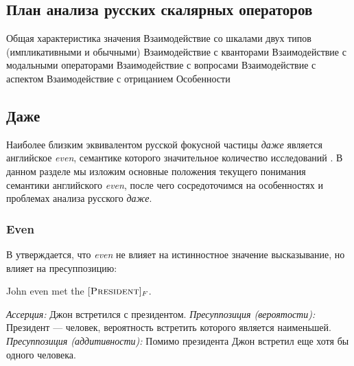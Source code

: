 \documentclass[a4paper, titlepage, 12pt]{article}
\begin{document}
\subsection{План анализа русских скалярных операторов} \label{additivityClassification}

\begin{exe}
    \ex \begin{xlist}
        \ex Общая характеристика значения
        \ex Взаимодействие со шкалами двух типов (импликативными и обычными)
        \ex Взаимодействие с кванторами
        \ex Взаимодействие с модальными операторами
        \ex Взаимодействие с вопросами
        \ex Взаимодействие с аспектом
        \ex Взаимодействие с отрицанием
        \ex Особенности
    \end{xlist}
\end{exe}

\subsection{Даже}

Наиболее близким эквивалентом русской фокусной частицы \textit{даже} является английское \textit{even}, семантике которого значительное количество исследований \citep{horn1969presuppositional,stalnaker1974pragmatic,rullmann1997even,iatridou2016our,kay1990even}. В данном разделе мы изложим основные положения текущего понимания семантики английского \textit{even}, после чего сосредоточимся на особенностях и проблемах анализа русского \textit{даже}.

\subsubsection{Even}

В \citep{horn1969presuppositional} утверждается, что \textit{even} не влияет на истинностное значение высказывание, но влияет на пресуппозицию:

\begin{exe}
    \ex \label{onlyAssPres} John even met the $ [\textsc{President}]_F $. \begin{xlist}
        \ex \textit{Ассерция:} Джон встретился с президентом.
        \ex \textit{Пресуппозиция (вероятости):} Президент --- человек, вероятность встретить которого является наименьшей.
        \ex \textit{Пресуппозиция (аддитивности):} Помимо президента Джон встретил еще хотя бы одного человека.
    \end{xlist}
\end{exe}
\end{document}
